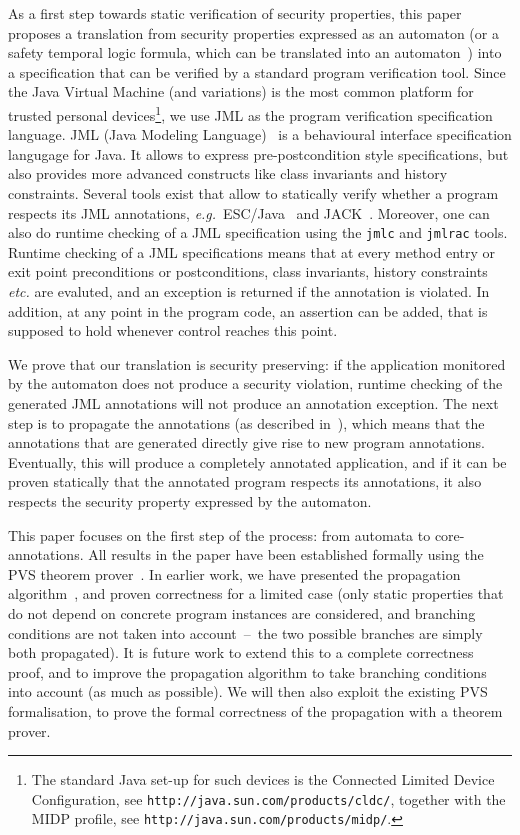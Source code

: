 As a first step towards static verification of security properties,
this paper proposes a translation from security properties expressed
as an automaton (or a safety temporal logic formula, which can be
translated into an automaton~\cite{Wolper?}) into a specification that
can be verified by a standard program verification tool. Since the
Java Virtual Machine (and variations) is the most common platform for
trusted personal devices\footnote{The standard Java set-up for such
devices is the Connected Limited Device Configuration, see
\texttt{http://java.sun.com/products/cldc/}, together with the MIDP
profile, see
\texttt{http://java.sun.com/products/midp/}.}, we use JML as the
program verification specification language.  JML (Java Modeling
Language)~\cite{Leavens...} is a behavioural interface specification
langugage for Java. It allows to express pre-postcondition style
specifications, but also provides more advanced constructs like class
invariants and history constraints. Several tools exist that allow to
statically verify whether a program respects its JML annotations,
\emph{e.g.}\ ESC/Java~\cite{CokK04} and
JACK~\cite{BartheCGHLPR07}. Moreover, one can also do
runtime checking of a JML specification using the
\texttt{jmlc} and
\texttt{jmlrac} tools. Runtime checking of a JML specifications means
that at every method entry or exit point preconditions or
postconditions, class invariants, history constraints \emph{etc.} are
evaluted, and an exception is returned if the annotation is
violated. In addition, at any point in the program code, an assertion
can be added, that is supposed to hold whenever control reaches this
point.

We prove that our translation is security preserving: if the
application monitored by the automaton does not produce a security
violation, runtime checking of the generated JML annotations will 
not produce an annotation exception. The next step is to
propagate the annotations (as described
in~\cite{PavlovaBBHL04cardis}), which means that the annotations that
are generated directly give rise to new program
annotations. Eventually, this will produce a completely annotated
application, and if it can be proven statically that the annotated
program respects its annotations, it also respects the security
property expressed by the automaton.

This paper focuses on the first step of the process: from automata to
core-annotations. All results in the paper have been established
formally using the PVS theorem prover~\cite{Owre?}. In earlier work,
we have presented the propagation
algorithm~\cite{PavlovaBBHL04cardis}, and proven correctness for a
limited case (only static properties that do not depend on concrete
program instances are considered, and branching conditions are not
taken into account~--~the two possible branches are simply both
propagated). It is future work to extend this to a complete
correctness proof, and to improve the propagation algorithm to take
branching conditions into account (as much as possible). We will then
also exploit the existing PVS formalisation, to prove the formal
correctness of the propagation with a theorem prover.

